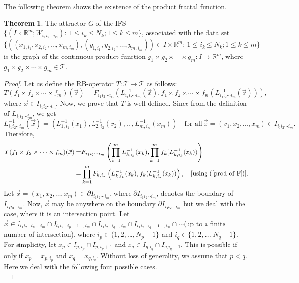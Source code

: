 \documentclass[10pt]{amsart}
\theoremstyle{definition}
\newtheorem{thm}{Theorem}[section]
\newcommand{\myseries}[3]{#1\leq #2\leq #3}
\newcommand{\myvec}[3]{#1=(#2_1,#2_2,\ldots,#2_#3)}
\newcommand{\profunc}[1]{#1_1\times#1_2\times\cdots\times#1_m}
\newcommand{\prodifs}[1]{#1_{i_1i_2\cdots i_m}}
\newcommand{\prodpoint}[2]{#1_{1,#2_1},#1_{2,#2_2},\ldots,#1_{m,#2_m}}
\begin{document}
	The following theorem shows the existence of the product fractal function.
	\begin{thm}
		The attractor $G$ of the IFS $\{(I\times\mathbb{R}^m;\prodifs{W}):~\myseries{1}{i_k}{N_k};\myseries{1}{k}{m}\}$, associated with the data set $\{((\prodpoint{x}{i}),(\prodpoint{y}{i}))\in I\times\mathbb{R}^m:~\myseries{1}{i_k}{N_k};\myseries{1}{k}{m}\}$ is the graph of the continuous product function $\profunc{g}: I\rightarrow\mathbb{R}^m$, where $\profunc{g}\in\mathscr{T}$. \label{graphofcpf}
	\end{thm}
	\begin{proof}
		Let us define the RB-operator $T:\mathscr{T}\rightarrow\mathscr{T}$ as follows: 
		\begin{equation}
			T(\profunc{f})(\vec{x})=\prodifs{F}\left(\prodifs{L^{-1}}(\vec{x}),\profunc{f}(\prodifs{L^{-1}}(\vec{x}))\right),\label{Rbop}
		\end{equation}
		where $\vec{x}\in\prodifs{I}$. Now, we prove that $T$ is well-defined. Since from the definition of $\prodifs{L}$, we get $$\prodifs{L^{-1}}(\vec{x})=\left(L_{1,i_1}^{-1}(x_1),L_{2,i_2}^{-1}(x_2),\ldots,L_{m,i_m}^{-1}(x_m)\right)\quad\mbox{for all}~ \myvec{\vec{x}}{x}{m}\in\prodifs{I}.$$
		Therefore,
		\begin{align*}
			T(\profunc{f})(\vec{x})=&\prodifs{F}\left(\prod_{k=1}^{m}L_{k,i_k}^{-1}(x_k),\prod_{k=1}^{m}f_k(L_{k,i_k}^{-1}(x_k))\right)\\
			=&\prod_{k=1}^{m}F_{k,i_k}\left(L_{k,i_k}^{-1}(x_k),f_k(L_{k,i_k}^{-1}(x_k))\right),\quad[\mbox{using (\ref{prod of F}})].
		\end{align*}
		Let $\myvec{\vec{x}}{x}{m}\in\partial\prodifs{I}$, where $\partial\prodifs{I}$, denotes the boundary of $\prodifs{I}$. Now, $\vec{x}$ may be anywhere on the boundary $\partial\prodifs{I}$ but we  deal with the case, where it is an intersection point. Let $\vec{x}\in I_{i_1i_2\cdots i_p\cdots,i_m}\cap I_{i_1i_2\cdots i_p+1\cdots,i_m}\cap I_{i_1i_2\cdots i_q\cdots,i_m}\cap I_{i_1i_2\cdots i_q+1\cdots,i_m}\cap\cdots$(up to a finite number of intersection), where $i_p\in\{1,2,\ldots,N_p-1\}$ and $i_q\in\{1,2,\ldots,N_q-1\}$. For simplicity, let $x_p\in I_{p,i_p}\cap I_{p,i_p+1}$ and $x_q\in I_{q,i_q}\cap I_{q,i_q+1}$. This is possible if only if $x_p=x_{p,i_p}$ and $x_q=x_{q,i_q}$. Without loss of generality, we assume that $p<q$. Here we  deal with the following four possible cases.\\ 
		

\end{proof}
\end{document}
